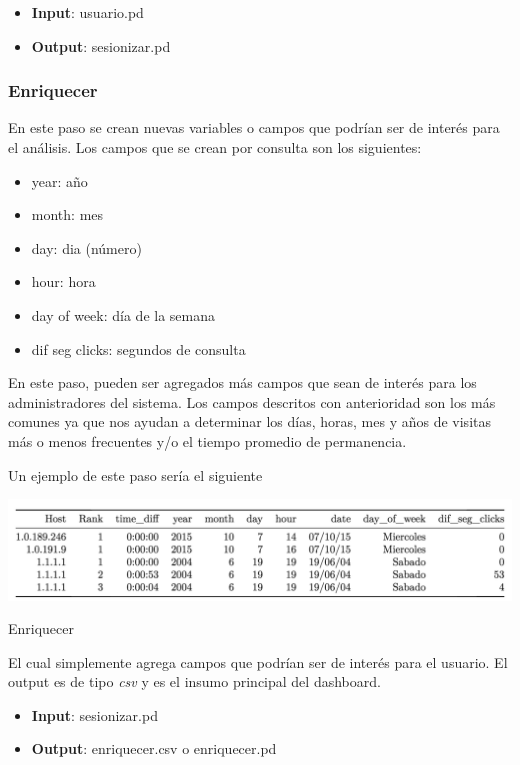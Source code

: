 \begin{itemize}
\item \textbf{Input}: usuario.pd
\item \textbf{Output}: sesionizar.pd
\end{itemize}



\subsubsection{Enriquecer}\label{v-enriquecer}

En este paso se crean nuevas variables o campos que podrían ser de
interés para el análisis. Los campos que se crean por consulta son los
siguientes:

\begin{itemize}
\itemsep1pt\parskip0pt
\item
  year: año
\item
  month: mes
\item
  day: dia (número)
\item
  hour: hora
\item
  day of week: día de la semana
\item
  dif seg clicks: segundos de consulta
\end{itemize}

En este paso, pueden ser agregados más campos que sean de interés para
los administradores del sistema. Los campos descritos con anterioridad
son los más comunes ya que nos ayudan a determinar los días, horas, mes
y años de visitas más o menos frecuentes y/o el tiempo promedio de permanencia.

Un ejemplo de este paso sería el siguiente

\begin{table}[H]
\centering
\includegraphics[width=1\textwidth]{Figures/tabla2.png}
\caption{Enriquecer}
\end{table}

El cual simplemente agrega campos que podrían ser de interés para el usuario. El output es de tipo \emph{csv} y es el insumo principal del dashboard.

\begin{itemize}
\item \textbf{Input}: sesionizar.pd 
\item \textbf{Output}: enriquecer.csv o enriquecer.pd
\end{itemize}


